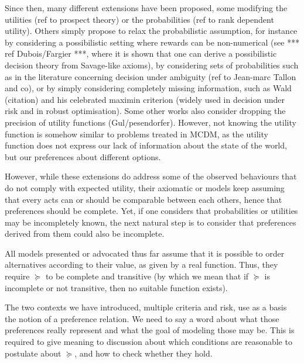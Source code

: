 \documentclass[french, english]{llncs}
\begin{document}
	Since then, many different extensions have been proposed, some modifying the utilities (ref to prospect theory) or the probabilities (ref to rank dependent utility). Others simply propose to relax the probabilistic assumption, for instance by considering a possibilistic setting where rewards can be non-numerical (see *** ref Dubois/Fargier ***, where it is shown that one can derive a possibilistic decision theory from Savage-like axioms), by considering sets of probabilities such as in the literature concerning decision under ambiguity (ref to Jean-marc Tallon and co), or by simply considering completely missing information, such as Wald (citation)  and his celebrated maximin criterion (widely used in decision under risk and in robust optimisation). Some other works also consider dropping the precision of utility functions (Gul/pesendorfer). However, not knowing the utility function is somehow similar to problems treated in MCDM, as the utility function does not express our lack of information about the state of the world, but our preferences about different options. 
	
	However, while these extensions do address some of the observed behaviours that do not comply with expected utility, their axiomatic or models keep assuming that every acts can or should be comparable between each others, hence that preferences should be complete. Yet, if one considers that probabilities or utilities may be incompletely known, the next natural step is to consider that preferences derived from them could also be incomplete. 
	
	All models presented or advocated thus far assume that it is possible to order alternatives according to their value, as given by a real function. Thus, they require $\succeq$ to be complete and transitive (by which we mean that if $\succeq$ is incomplete or not transitive, then no suitable function exists).
	
	The two contexts we have introduced, multiple criteria and risk, use as a basis the notion of a preference relation. We need to say a word about what those preferences really represent and what the goal of modeling those may be. This is required to give meaning to discussion about which conditions are reasonable to postulate about $\succeq$, and how to check whether they hold.
	
\end{document}
